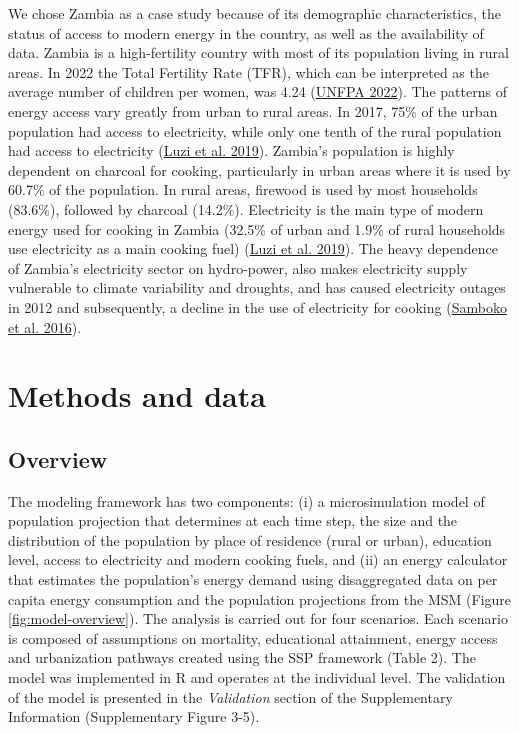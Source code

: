 \documentclass[
]{article}
\begin{document}
We chose Zambia as a case study because of its demographic characteristics, the status of access to modern energy in the country, as well as the availability of data. Zambia is a high-fertility country with most of its population living in rural areas. In 2022 the Total Fertility Rate (TFR), which can be interpreted as the average number of children per women, was 4.24 (\protect\hyperlink{ref-unfpa_world_2022}{UNFPA 2022}). The patterns of energy access vary greatly from urban to rural areas. In 2017, 75\% of the urban population had access to electricity, while only one tenth of the rural population had access to electricity (\protect\hyperlink{ref-luzi_zambia_2019}{Luzi et al. 2019}). Zambia's population is highly dependent on charcoal for cooking, particularly in urban areas where it is used by 60.7\% of the population. In rural areas, firewood is used by most households (83.6\%), followed by charcoal (14.2\%). Electricity is the main type of modern energy used for cooking in Zambia (32.5\% of urban and 1.9\% of rural households use electricity as a main cooking fuel) (\protect\hyperlink{ref-luzi_zambia_2019}{Luzi et al. 2019}). The heavy dependence of Zambia's electricity sector on hydro-power, also makes electricity supply vulnerable to climate variability and droughts, and has caused electricity outages in 2012 and subsequently, a decline in the use of electricity for cooking (\protect\hyperlink{ref-samboko_load_2016}{Samboko et al. 2016}).

\hypertarget{methods-and-data}{%
\section{Methods and data}\label{methods-and-data}}

\hypertarget{overview}{%
\subsection{Overview}\label{overview}}

The modeling framework has two components: (i) a microsimulation model of population projection that determines at each time step, the size and the distribution of the population by place of residence (rural or urban), education level, access to electricity and modern cooking fuels, and (ii) an energy calculator that estimates the population's energy demand using disaggregated data on per capita energy consumption and the population projections from the MSM (Figure \ref{fig:model-overview}). The analysis is carried out for four scenarios. Each scenario is composed of assumptions on mortality, educational attainment, energy access and urbanization pathways created using the SSP framework (Table 2). The model was implemented in R and operates at the individual level. The validation of the model is presented in the \emph{Validation} section of the Supplementary Information (Supplementary Figure 3-5).
\end{document}
